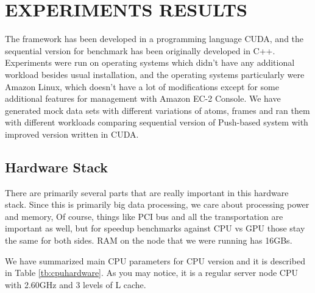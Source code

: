 \documentclass[12pt,letterpaper]{report}
\begin{document}
\chapter{EXPERIMENTS RESULTS}\label{sc:experiments}
\noindent\hspace{3em} The framework has been developed in a programming language CUDA, and the sequential version for benchmark\cite{mainPaper} has been originally developed in C++. Experiments were run on operating systems which didn't have any additional workload besides usual installation, and the operating systems particularly were Amazon Linux, which doesn't have a lot of modifications except for some additional features for management with Amazon EC-2 Console. We have generated mock data sets with different variations of atoms, frames and ran them with different workloads comparing sequential version of Push-based system with improved version written in CUDA.

\section{Hardware Stack}
\noindent\hspace{3em} There are primarily several parts that are really important in this hardware stack. Since this is primarily big data processing, we care about processing power and memory, Of course, things like PCI bus and all the transportation are important as well, but for speedup benchmarks against CPU vs GPU those stay the same for both sides. RAM on the node that we were running has 16GBs. 

\noindent\hspace{3em} We have summarized main CPU parameters for CPU version and it is described in Table \ref{tb:cpuhardware}. As you may notice, it is a regular server node CPU with 2.60GHz and 3 levels of L cache.
\end{document}
